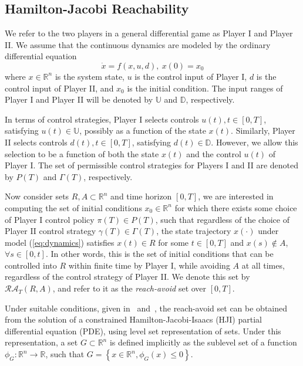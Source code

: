 \documentclass[letterpaper, 10 pt, conference]{ieeeconf}  %
\numberwithin{algorithm}{section}
\begin{document}
\subsection{Hamilton-Jacobi Reachability}
\label{subsec:hj_background}
We refer to the two players in a general differential game as Player I and Player II. We assume that the continuous dynamics are modeled by the ordinary differential equation 
\begin{equation}
\label{eq:dynamics}
\dot{x} = f(x, u, d), \ x(0) = x_0
\end{equation}
where $x \in \mathbb{R}^n$ is the system state,  $u$ is the control input of Player I, $d$ is the control input of Player II, and $x_0$ is the initial condition. The input ranges of Player I and Player II will be denoted by $\mathbb{U}$ and $\mathbb{D}$, respectively. 

In terms of control strategies, Player I selects controls $u(t), t \in [0,T]$, satisfying $u(t) \in \mathbb{U}$, possibly as a function of the state $x(t)$. Similarly, Player II selects controls $d(t), t \in [0,T]$, satisfying $d(t) \in \mathbb{D}$. However, we allow this selection to be a function of both the state $x(t)$
and the control $u(t)$ of Player I. The set of permissible control strategies for Players I and II are denoted by $P(T)$ and $\Gamma(T)$, respectively.

Now consider sets $R, A \subset \mathbb{R}^n$ and time horizon $[0, T]$, we are interested in computing the set of initial conditions $x_0 \in \mathbb{R}^n$ for which there exists some choice of Player I control policy $\pi(T) \in P(T)$, such that regardless of the choice of Player II control strategy $\gamma(T) \in \Gamma(T)$, the state trajectory $x(\cdot)$ under model (\ref{eq:dynamics}) satisfies $x(t) \in R$ for some $t \in [0,T]$ and $x(s) \notin A$, $\forall s \in [0,t]$. In other words, this is the set of initial conditions that can be controlled into $R$ within finite time by Player I, while avoiding $A$ at all times, regardless of the control strategy of Player II. We denote this set by $\mathcal{RA}_T(R,A)$, and refer to it as the \emph{reach-avoid} set over $[0,T]$.

Under suitable conditions, given in~\cite{j:mitchell-TAC-2005} and~\cite{mitchell-thesis}, the reach-avoid set can be obtained from the solution of a constrained Hamilton-Jacobi-Isaacs (HJI) partial differential equation (PDE), using level set representation of sets. Under this representation, a set $G \subset \mathbb{R}^n$ is defined implicitly as the sublevel set of a function $\phi_G: \mathbb{R}^n \rightarrow \mathbb{R}$, such that $G = \left\{x\in \mathbb{R}^n, \phi_G (x) \leq 0\right\}$.
\end{document}
